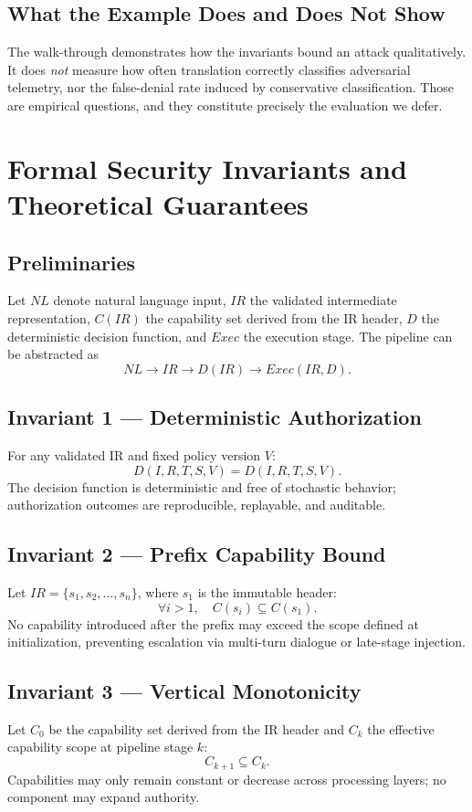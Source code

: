 \documentclass[conference]{IEEEtran}
\begin{document}
\subsection{What the Example Does and Does Not Show}
The walk-through demonstrates how the invariants bound an attack
qualitatively. It does \emph{not} measure how often translation correctly
classifies adversarial telemetry, nor the false-denial rate induced by
conservative classification. Those are empirical questions, and they
constitute precisely the evaluation we defer.

\section{Formal Security Invariants and Theoretical Guarantees}
\label{sec:formal}

\subsection{Preliminaries}
Let $NL$ denote natural language input, $IR$ the validated intermediate
representation, $C(IR)$ the capability set derived from the IR header, $D$
the deterministic decision function, and $\mathit{Exec}$ the execution
stage. The pipeline can be abstracted as
\[
NL \rightarrow IR \rightarrow D(IR) \rightarrow \mathit{Exec}(IR, D).
\]

\subsection{Invariant 1 --- Deterministic Authorization}
For any validated IR and fixed policy version $V$:
\[
D(I, R, T, S, V) = D(I, R, T, S, V).
\]
The decision function is deterministic and free of stochastic behavior;
authorization outcomes are reproducible, replayable, and auditable.

\subsection{Invariant 2 --- Prefix Capability Bound}
Let $IR = \{s_1, s_2, \dots, s_n\}$, where $s_1$ is the immutable header:
\[
\forall i > 1, \quad C(s_i) \subseteq C(s_1).
\]
No capability introduced after the prefix may exceed the scope defined at
initialization, preventing escalation via multi-turn dialogue or
late-stage injection.

\subsection{Invariant 3 --- Vertical Monotonicity}
Let $C_0$ be the capability set derived from the IR header and $C_k$ the
effective capability scope at pipeline stage $k$:
\[
C_{k+1} \subseteq C_k.
\]
Capabilities may only remain constant or decrease across processing
layers; no component may expand authority.
\end{document}
